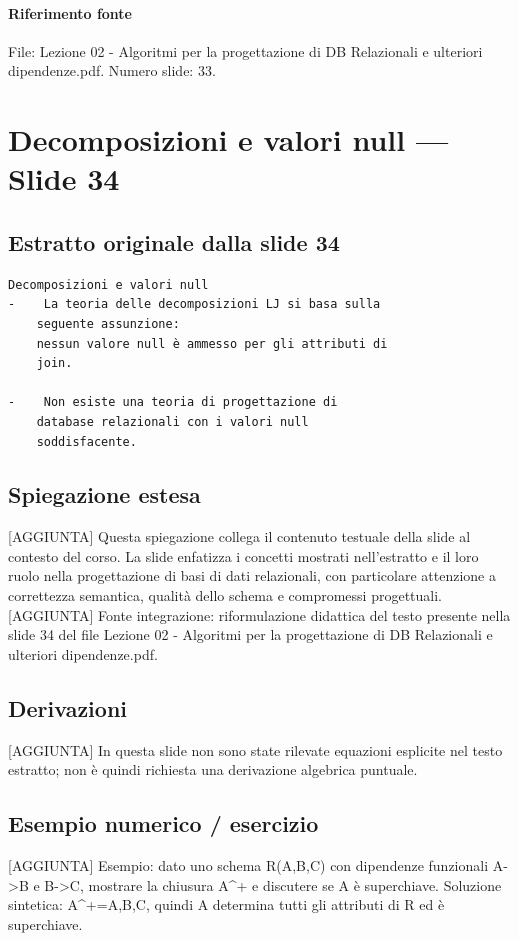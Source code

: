 \documentclass[11pt]{article}
\begin{document}
\paragraph{Riferimento fonte} File: Lezione 02 - Algoritmi per la progettazione di DB Relazionali e ulteriori dipendenze.pdf. Numero slide: 33.
\section{Decomposizioni e valori null --- Slide 34}
\subsection*{Estratto originale dalla slide 34}
\begin{lstlisting}
Decomposizioni e valori null
-    La teoria delle decomposizioni LJ si basa sulla
    seguente assunzione:
    nessun valore null è ammesso per gli attributi di
    join.

-    Non esiste una teoria di progettazione di
    database relazionali con i valori null
    soddisfacente.
\end{lstlisting}
\subsection*{Spiegazione estesa}
[AGGIUNTA] Questa spiegazione collega il contenuto testuale della slide al contesto del corso. La slide enfatizza i concetti mostrati nell'estratto e il loro ruolo nella progettazione di basi di dati relazionali, con particolare attenzione a correttezza semantica, qualità dello schema e compromessi progettuali.
[AGGIUNTA] Fonte integrazione: riformulazione didattica del testo presente nella slide 34 del file Lezione 02 - Algoritmi per la progettazione di DB Relazionali e ulteriori dipendenze.pdf.
\subsection*{Derivazioni}
[AGGIUNTA] In questa slide non sono state rilevate equazioni esplicite nel testo estratto; non è quindi richiesta una derivazione algebrica puntuale.
\subsection*{Esempio numerico / esercizio}
[AGGIUNTA] Esempio: dato uno schema R(A,B,C) con dipendenze funzionali A->B e B->C, mostrare la chiusura A^+ e discutere se A è superchiave. Soluzione sintetica: A^+={A,B,C}, quindi A determina tutti gli attributi di R ed è superchiave.
\end{document}
